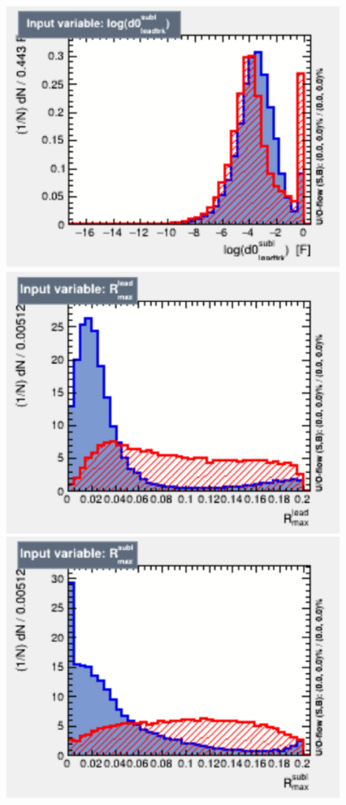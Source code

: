 \begin{figure}[th!]
    \includegraphics[width=\individualPlotWidth]{Assets/Plots/DiTau/BDT_vars/d0_leadtrack_subl.pdf}
    \includegraphics[width=\individualPlotWidth]{Assets/Plots/DiTau/BDT_vars/R_lead_max.pdf}
    \includegraphics[width=\individualPlotWidth]{Assets/Plots/DiTau/BDT_vars/R_subl_max.pdf}

\end{figure}
